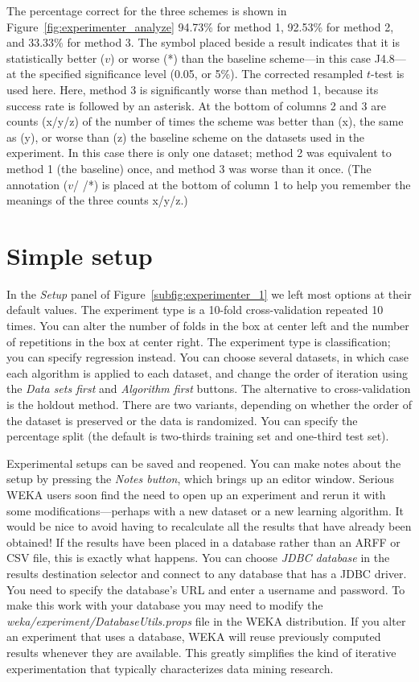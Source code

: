 The percentage correct for the three schemes is shown in
Figure~\ref{fig:experimenter_analyze} 94.73\% for method 1, 92.53\%
for method 2, and 33.33\% for method 3. The symbol placed beside a
result indicates that it is statistically better ($v$) or worse (*)
than the baseline scheme---in this case J4.8---at the specified
significance level (0.05, or 5\%). The corrected resampled $t$-test is
used here. Here, method 3 is significantly worse than method 1,
because its success rate is followed by an asterisk. At the bottom of
columns 2 and 3 are counts (x/y/z) of the number of times the scheme
was better than (x), the same as (y), or worse than (z) the baseline
scheme on the datasets used in the experiment. In this case there is
only one dataset; method 2 was equivalent to method 1 (the baseline)
once, and method 3 was worse than it once. (The annotation ($v$/  /*) is
placed at the bottom of column 1 to help you remember the meanings of
the three counts x/y/z.)

\section{Simple setup}

In the \textit{Setup} panel of Figure~\ref{subfig:experimenter_1} we
left most options at their default values. The experiment type is a
10-fold cross-validation repeated 10 times. You can alter the number
of folds in the box at center left and the number of repetitions in
the box at center right. The experiment type is classification; you
can specify regression instead. You can choose several datasets, in
which case each algorithm is applied to each dataset, and change the
order of iteration using the \textit{Data sets first} and
\textit{Algorithm first} buttons. The alternative to cross-validation
is the holdout method. There are two variants, depending on whether
the order of the dataset is preserved or the data is randomized. You
can specify the percentage split (the default is two-thirds training
set and one-third test set).

Experimental setups can be saved and reopened. You can make notes
about the setup by pressing the \textit{Notes button}, which brings up
an editor window. Serious WEKA users soon find the need to open up an
experiment and rerun it with some modifications---perhaps with a new
dataset or a new learning algorithm. It would be nice to avoid having
to recalculate all the results that have already been obtained! If the
results have been placed in a database rather than an ARFF or CSV
file, this is exactly what happens. You can choose \textit{JDBC
  database} in the results destination selector and connect to any
database that has a JDBC driver. You need to specify the database's
URL and enter a username and password. To make this work with your
database you may need to modify the
\textit{weka/experiment/DatabaseUtils.props} file in the WEKA
distribution. If you alter an experiment that uses a database, WEKA
will reuse previously computed results whenever they are
available. This greatly simplifies the kind of iterative
experimentation that typically characterizes data mining research.

